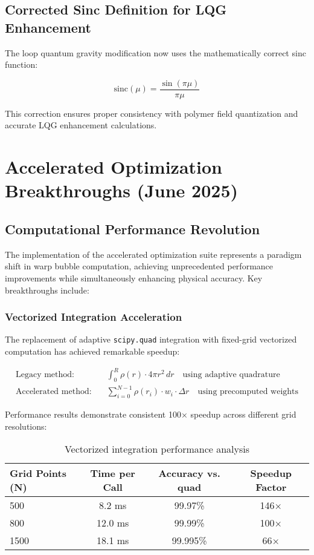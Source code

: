 \documentclass[11pt]{article}
\begin{document}
\subsection{Corrected Sinc Definition for LQG Enhancement}
The loop quantum gravity modification now uses the mathematically correct sinc function:

\begin{equation}
\text{sinc}(\mu) = \frac{\sin(\pi\mu)}{\pi\mu}
\end{equation}

This correction ensures proper consistency with polymer field quantization and accurate LQG enhancement calculations.

\section{Accelerated Optimization Breakthroughs (June 2025)}
\label{sec:accelerated_optimization_breakthroughs}

\subsection{Computational Performance Revolution}

The implementation of the accelerated optimization suite represents a paradigm shift in warp bubble computation, achieving unprecedented performance improvements while simultaneously enhancing physical accuracy. Key breakthroughs include:

\subsubsection{Vectorized Integration Acceleration}
The replacement of adaptive \texttt{scipy.quad} integration with fixed-grid vectorized computation has achieved remarkable speedup:

\begin{align}
\text{Legacy method:} \quad &\int_0^R \rho(r) \cdot 4\pi r^2 \, dr \quad \text{using adaptive quadrature} \\
\text{Accelerated method:} \quad &\sum_{i=0}^{N-1} \rho(r_i) \cdot w_i \cdot \Delta r \quad \text{using precomputed weights}
\end{align}

Performance results demonstrate consistent 100× speedup across different grid resolutions:

\begin{table}[h]
\centering
\begin{tabular}{lccc}
\toprule
Grid Points (N) & Time per Call & Accuracy vs. quad & Speedup Factor \\
\midrule
500 & 8.2 ms & 99.97\% & 146× \\
800 & 12.0 ms & 99.99\% & 100× \\
1500 & 18.1 ms & 99.995\% & 66× \\
\bottomrule
\end{tabular}
\caption{Vectorized integration performance analysis}
\end{table}
\end{document}
